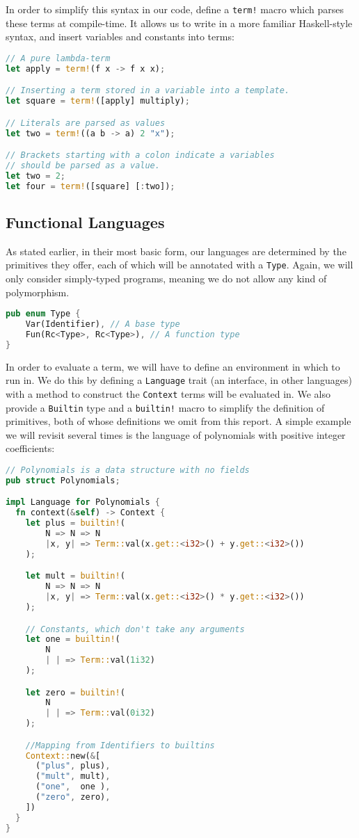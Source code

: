 In order to simplify this syntax in our code, define a \texttt{term!} macro which parses these terms at compile-time. It allows us to write in a more familiar Haskell-style syntax, and insert variables and constants into terms:

\begin{lstlisting}[language=rust]
// A pure lambda-term
let apply = term!(f x -> f x x);

// Inserting a term stored in a variable into a template.
let square = term!([apply] multiply); 

// Literals are parsed as values  
let two = term!((a b -> a) 2 "x");

// Brackets starting with a colon indicate a variables
// should be parsed as a value.
let two = 2;
let four = term!([square] [:two]);
\end{lstlisting}

\subsection{Functional Languages}

As stated earlier, in their most basic form, our languages are determined by the primitives they offer, each of which will be annotated with a \texttt{Type}. Again, we will only consider simply-typed programs, meaning we do not allow any kind of polymorphism.

\begin{lstlisting}[language=rust]
pub enum Type {
    Var(Identifier), // A base type
    Fun(Rc<Type>, Rc<Type>), // A function type
}
\end{lstlisting}

In order to evaluate a term, we will have to define an environment in which to run in. We do this by defining a \texttt{Language} trait (an interface, in other languages) with a method to construct the \texttt{Context} terms will be evaluated in. We also provide a \texttt{Builtin} type and a \texttt{builtin!} macro to simplify the definition of primitives, both of whose definitions we omit from this report. A simple example we will revisit several times is the language of polynomials with positive integer coefficients:

\begin{lstlisting}[language=rust]
// Polynomials is a data structure with no fields
pub struct Polynomials;

impl Language for Polynomials {
  fn context(&self) -> Context {
    let plus = builtin!(
        N => N => N 
        |x, y| => Term::val(x.get::<i32>() + y.get::<i32>())
    );

    let mult = builtin!(
        N => N => N
        |x, y| => Term::val(x.get::<i32>() * y.get::<i32>())
    );

    // Constants, which don't take any arguments
    let one = builtin!(
        N
        | | => Term::val(1i32)
    );

    let zero = builtin!(
        N
        | | => Term::val(0i32)
    );

    //Mapping from Identifiers to builtins
    Context::new(&[
      ("plus", plus),
      ("mult", mult),
      ("one",  one ),
      ("zero", zero),
    ])
  }
}
\end{lstlisting}

